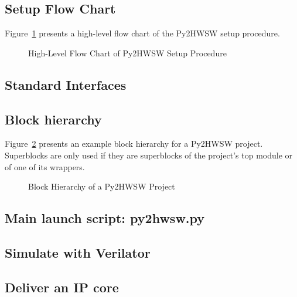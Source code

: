 \documentclass{ug}
\begin{document}
\subsection{Setup Flow Chart}
\label{sec:py2_flow_chart}

Figure~\ref{fig:py2_flow_chart} presents a high-level flow chart of the Py2HWSW setup procedure.

\begin{figure}[H]
  \vspace{-0.7cm}
  \caption{High-Level Flow Chart of Py2HWSW Setup Procedure}
  \label{fig:py2_flow_chart}
\end{figure}

\subsection{Standard Interfaces}
\label{sec:py2_standard_interfaces}


\subsection{Block hierarchy}
\label{sec:py2_block_hierarchy}

Figure~\ref{fig:py2_superblocks_subblocks} presents an example block hierarchy for a Py2HWSW project.
Superblocks are only used if they are superblocks of the project's top module or of one of its wrappers.

\begin{figure}[H]
  \vspace{-0.7cm}
  \caption{Block Hierarchy of a Py2HWSW Project}
  \label{fig:py2_superblocks_subblocks}
\end{figure}

\subsection{Main launch script: py2hwsw.py}
\label{sec:launch_script}


\subsection{Simulate with Verilator}
\label{sec:verilator}


\subsection{Deliver an IP core}
\label{sec:deliver}

%
%
\end{document}
